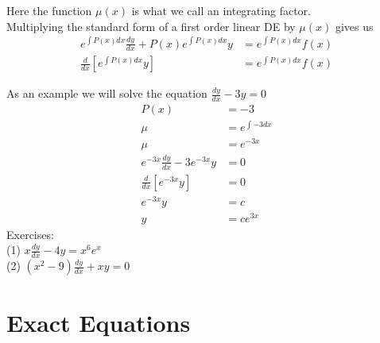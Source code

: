\documentclass{report}
\begin{document}
    Here the function \(\mu(x)\) is what we call an integrating factor. \\

    Multiplying the standard form of a first order linear DE by \(\mu(x)\) gives us
    \begin{align*}
        e^{\int P(x)dx}\frac{dy}{dx}+P(x)e^{\int P(x)dx}y&=e^{\int P(x)dx}f(x)\\
        \frac{d}{dx}\left[e^{\int P(x)dx}y\right]&=e^{\int P(x)dx}f(x)
    \end{align*}
    
    As an example we will solve the equation \(\frac{dy}{dx}-3y=0\)\\
    \begin{align*}
        P(x) &=-3\\
        \mu &= e^{\int -3dx}\\
        \mu &= e^{-3x}\\
        e^{-3x}\frac{dy}{dx} - 3e^{-3x}y&=0\\
        \frac{d}{dx}\left[e^{-3x}y\right]&=0\\
        e^{-3x}y&=c\\
        y&=ce^{3x}
    \end{align*}
    Exercises: \\
    (1) \(x\frac{dy}{dx}-4y=x^6e^x\)\\
    (2) \((x^2-9)\frac{dy}{dx}+xy=0\)
    \section{Exact Equations}
\end{document}
